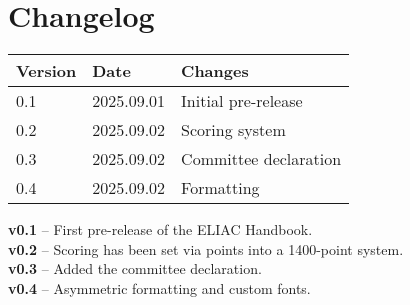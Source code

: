 
\section*{Changelog}

\begin{tabular}{lll}
\toprule
Version & Date & Changes \\ \midrule
0.1 & 2025.09.01 & Initial pre-release \\ \midrule
0.2 & 2025.09.02 & Scoring system\\ \midrule
0.3 & 2025.09.02 & Committee declaration\\ \midrule
0.4 & 2025.09.02 & Formatting\\ \bottomrule
\end{tabular}

\vspace{1cm}

\noindent\textbf{v0.1} – First pre-release of the ELIAC Handbook.\\
\noindent\textbf{v0.2} – Scoring has been set via points into a 1400-point system.\\
\noindent\textbf{v0.3} – Added the committee declaration.\\
\noindent\textbf{v0.4} – Asymmetric formatting and custom fonts. 
